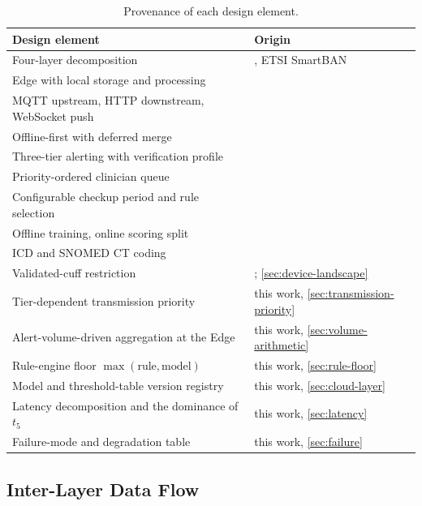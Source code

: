 \documentclass[12pt,a4paper,oneside]{report}
\begin{document}
\begin{table}[htbp]
\centering\footnotesize
\caption{Provenance of each design element.}\label{tab:traceability}
\begin{tabularx}{\textwidth}{@{}X >{\raggedright\arraybackslash}p{5.4cm}@{}}
\toprule
\textbf{Design element} & \textbf{Origin} \\
\midrule
Four-layer decomposition & \textcite{mucchi2021}, ETSI SmartBAN \\
Edge with local storage and processing & \textcite{mucchi2021} \\
MQTT upstream, HTTP downstream, WebSocket push & \textcite{efendi2025} \\
Offline-first with deferred merge & \textcite{efendi2025} \\
Three-tier alerting with verification profile & \textcite{mihevc2025} \\
Priority-ordered clinician queue & \textcite{yazdani2018} \\
Configurable checkup period and rule selection & \textcite{yazdani2018} \\
Offline training, online scoring split & \textcite{liu2025review} \\
ICD and SNOMED CT coding & \textcite{liu2025review} \\
Validated-cuff restriction & \textcite{who2023hypertension}; \cref{sec:device-landscape} \\
Tier-dependent transmission priority & this work, \cref{sec:transmission-priority} \\
Alert-volume-driven aggregation at the Edge & this work, \cref{sec:volume-arithmetic} \\
Rule-engine floor $\max(\text{rule},\text{model})$ & this work, \cref{sec:rule-floor} \\
Model and threshold-table version registry & this work, \cref{sec:cloud-layer} \\
Latency decomposition and the dominance of $t_5$ & this work, \cref{sec:latency} \\
Failure-mode and degradation table & this work, \cref{sec:failure} \\
\bottomrule
\end{tabularx}
\end{table}

\subsection{Inter-Layer Data Flow}\label{sec:dataflow}
\end{document}
